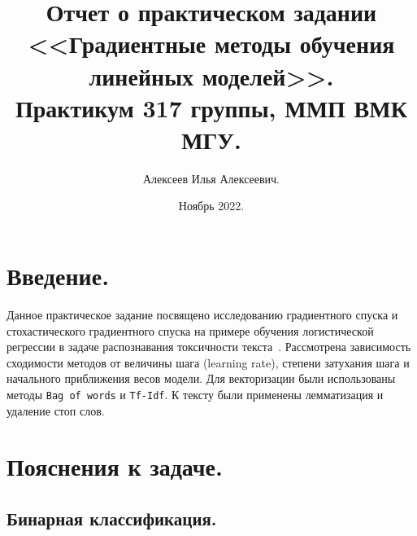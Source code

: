 \documentclass[12pt]{extarticle}
\title{Отчет о практическом задании \\ <<Градиентные методы обучения линейных моделей>>.\\[6mm] \large Практикум 317 группы, ММП ВМК МГУ.}
\author{Алексеев Илья Алексеевич.}
\date{Ноябрь 2022.}
\begin{document}
\maketitle

\tableofcontents

\newpage

\section{Введение.}

Данное практическое задание посвящено исследованию градиентного спуска и стохастического градиентного спуска на примере обучения логистической регрессии в задаче распознавания токсичности текста~\cite{kaggle}. Рассмотрена зависимость сходимости методов от величины шага (learning rate), степени затухания шага и начального приближения весов модели. Для векторизации были использованы методы \texttt{Bag of words} и \texttt{Tf-Idf}. К тексту были применены лемматизация и удаление стоп слов.

\section{Пояснения к задаче.}

\subsection{Бинарная классификация.}
\end{document}
